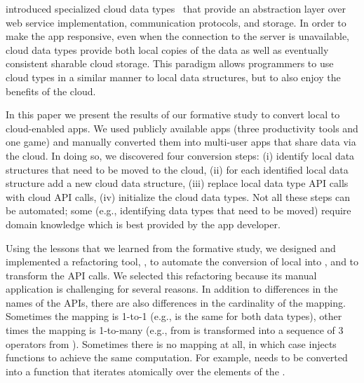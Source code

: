 \documentclass[preprint]{sigplanconf}
\begin{document}
\TD introduced specialized cloud data types~\cite{burckhardt2012cloud} that provide an abstraction layer over web service implementation, communication protocols, and storage.  In order to make the app responsive, even when the connection to the server is unavailable, cloud data types provide both local copies of the data as well as eventually consistent sharable cloud storage. This paradigm allows programmers to use cloud types in a similar manner to local data structures, but to also enjoy the benefits of the cloud.

In this paper we present the results of our formative study to convert local to cloud-enabled apps. We used \numFormative publicly available \TD apps (three productivity tools and one game) and manually converted them into multi-user apps that share data via the cloud. In doing so, we discovered four conversion steps: (i) identify local data structures that need to be moved to the cloud, (ii) for each identified local data structure add a new cloud data structure, (iii) replace local data type API calls with cloud API calls, (iv) initialize the cloud data types. Not all these steps can be automated; some (e.g., identifying data types that need to be moved) require domain knowledge which is best provided by the app developer. 

Using the lessons that we learned from the formative study, we designed and implemented a refactoring tool, \tool, to automate the conversion of local \NC{} into , and to transform the API calls. We selected this refactoring because its manual application is 
challenging for several reasons.
In addition to differences in the names of the APIs, there are also differences in the cardinality of the mapping.
Sometimes the mapping is 1-to-1 (e.g.,  is the same for both data types), other times the mapping is 1-to-many (e.g.,  from  is transformed into a sequence of 3 operators from ). Sometimes there is no mapping at all, in which case \tool injects functions to achieve the same computation. For example,  needs to be converted into a function that iterates atomically over the elements of the . 
\end{document}
